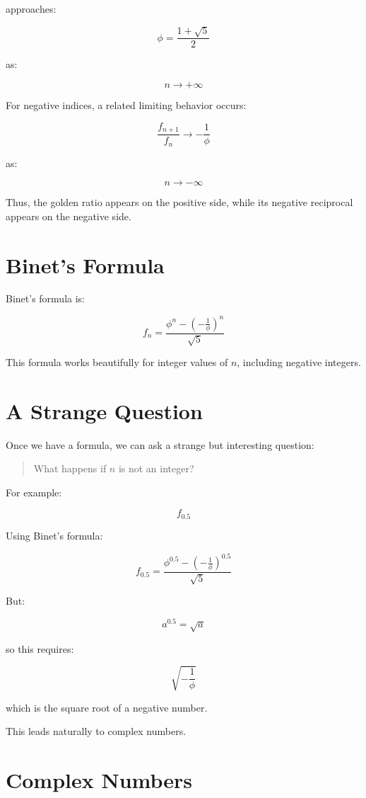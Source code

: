 \documentclass[11pt]{article}
\begin{document}
approaches:

\[
\phi = \frac{1+\sqrt{5}}{2}
\]

as:

\[
n \rightarrow +\infty
\]

For negative indices, a related limiting behavior occurs:

\[
\frac{f_{n+1}}{f_n}
\rightarrow
-\frac{1}{\phi}
\]

as:

\[
n \rightarrow -\infty
\]

Thus, the golden ratio appears on the positive side, while its negative reciprocal appears on the negative side.

\section{Binet's Formula}

Binet's formula is:

\[
f_n =
\frac{
\phi^n -
\left(-\frac{1}{\phi}\right)^n
}{
\sqrt{5}
}
\]

This formula works beautifully for integer values of \(n\), including negative integers.

\section{A Strange Question}

Once we have a formula, we can ask a strange but interesting question:

\begin{quote}
What happens if \(n\) is not an integer?
\end{quote}

For example:

\[
f_{0.5}
\]

Using Binet's formula:

\[
f_{0.5}
=
\frac{
\phi^{0.5}
-
\left(-\frac{1}{\phi}\right)^{0.5}
}{
\sqrt{5}
}
\]

But:

\[
a^{0.5} = \sqrt{a}
\]

so this requires:

\[
\sqrt{-\frac{1}{\phi}}
\]

which is the square root of a negative number.

This leads naturally to complex numbers.

\section{Complex Numbers}
\end{document}
